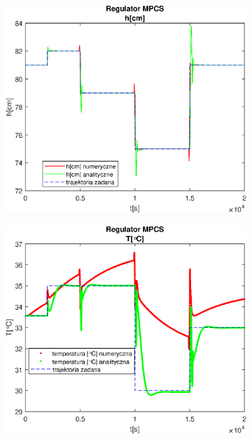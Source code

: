 \begin{figure}[h!]
   \centering
   \begin{subfigure}[b]{0.4\textwidth}
      \includegraphics[width=1\linewidth]{img/MPCSnumRK/MPCSRKHN100Nu25l5.eps}
      \caption{}
      \label{fig:fig:MPCSRKN100Nu25l51}
   \end{subfigure}
       
   \begin{subfigure}[b]{0.4\textwidth}
      \includegraphics[width=1\linewidth]{img/MPCSnumRK/MPCSRKTN100Nu25l5.eps}
      \caption{}
      \label{fig:fig:MPCSRKN100Nu25l52}
   \end{subfigure}
       

\end{figure}
